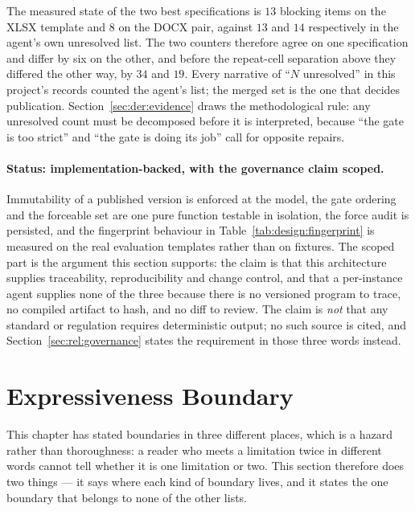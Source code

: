 The measured state of the two best specifications is $13$ blocking items on the XLSX template
and $8$ on the DOCX pair, against $13$ and $14$ respectively in the agent's own unresolved list.
The two counters therefore agree on one specification and differ by six on the other, and before
the repeat-cell separation above they differed the other way, by $34$ and $19$. Every narrative
of ``$N$ unresolved'' in this project's records counted the agent's list; the merged set is the
one that decides publication.
Section~\ref{sec:der:evidence} draws the methodological rule: any unresolved count must be
decomposed before it is interpreted, because ``the gate is too strict'' and ``the gate is doing
its job'' call for opposite repairs.

\paragraph{Status: implementation-backed, with the governance claim scoped.}
Immutability of a published version is enforced at the model, the gate ordering and the
forceable set are one pure function testable in isolation, the force audit is persisted, and the
fingerprint behaviour in Table~\ref{tab:design:fingerprint} is measured on the real evaluation
templates rather than on fixtures. The scoped part is the argument this section supports: the
claim is that this architecture supplies traceability, reproducibility and change control, and
that a per-instance agent supplies none of the three because there is no versioned program to
trace, no compiled artifact to hash, and no diff to review. The claim is \emph{not} that any
standard or regulation requires deterministic output; no such source is cited, and
Section~\ref{sec:rel:governance} states the requirement in those three words instead.

\section{Expressiveness Boundary}
\label{sec:design:boundary}

This chapter has stated boundaries in three different places, which is a hazard rather than
thoroughness: a reader who meets a limitation twice in different words cannot tell whether it is
one limitation or two. This section therefore does two things --- it says where each kind of
boundary lives, and it states the one boundary that belongs to none of the other lists.

